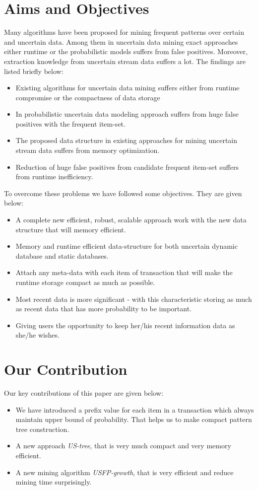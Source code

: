 \section{Aims and Objectives}
Many algorithms have been proposed for mining frequent patterns over certain and uncertain data. Among them in uncertain data mining exact approaches either runtime or the probabilistic models suffers from false positives. Moreover, extraction knowledge from uncertain stream data suffers a lot. The findings are listed briefly below:
\begin{itemize}
    \item Existing algorithms for uncertain data mining suffers either from runtime compromise or the compactness of data storage
    \item In probabilistic uncertain data modeling approach suffers from huge false positives with the frequent item-set.
    \item The proposed data structure in existing approaches for mining uncertain stream data suffers from memory optimization.
    \item Reduction of huge false positives from candidate frequent item-set suffers from runtime inefficiency.
\end{itemize}
To overcome these problems we have followed some objectives. They are given below:
\begin{itemize}
    \item A complete new efficient, robust, scalable approach work with the new data structure that will memory efficient.
    \item Memory and runtime efficient data-structure for both uncertain dynamic database and static databases.
    \item Attach any meta-data with each item of transaction that will make the runtime storage compact as much as possible.
    \item Most recent data is more significant - with this characteristic storing as much as recent data that has more probability to be important.
    \item Giving users the opportunity to keep her/his recent information data as she/he wishes.

\end{itemize}


\section{Our Contribution}
Our key contributions of this paper are given below:
\begin{itemize}
\item We have introduced a prefix value for each item in a transaction which always maintain upper bound of probability. That helps us to make compact pattern tree construction.
\item A new approach \emph{US-tree}, that is very much compact and very memory efficient.
\item A new mining algorithm \emph{USFP-growth}, that is very efficient and reduce mining time surprisingly.
\end{itemize}


